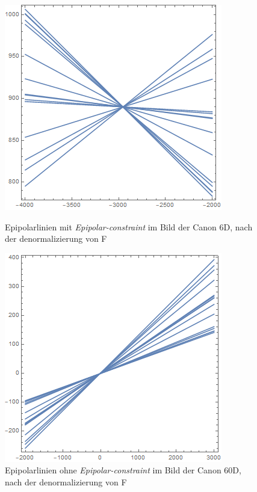 \begin{figure}[!htb]
	\includegraphics[width=\linewidth]{images/L_PC1_F_Constraint_denormalized.png}
	\caption{Epipolarlinien mit \textit{Epipolar-constraint} im Bild der Canon 6D, nach der denormalizierung von F}
	\label{fig:awesome_image1}
	\endminipage\hfill
	\includegraphics[width=\linewidth]{images/LPrime_PC2_F_Constraint_denormalized.png}
	\caption{Epipolarlinien ohne \textit{Epipolar-constraint} im Bild der Canon 60D, nach der denormalizierung von F}
	\label{fig:awesome_image2}
	\endminipage\hfill
\end{figure}

